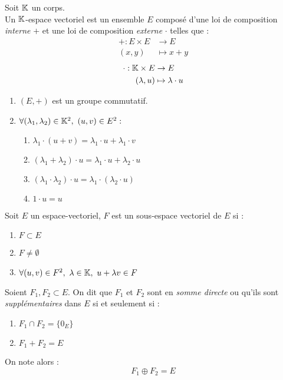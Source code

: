 \begin{definition}
	Soit $\mathbb{K}$ un corps. 
	\\
	Un $\mathbb{K}$-espace vectoriel est un ensemble $E$ composé d'une loi de composition \emph{interne} \og $+$ \fg et une loi de composition \emph{externe} \og $\cdot$ \fg telles que :
	\begin{align*}
		+ : E \times E &\to E \\
		(x, y) &\mapsto x + y
	\end{align*}
	\begin{align*}
		\cdot : \mathbb{K} \times E &\to E \\
		(\lambda, u) &\mapsto \lambda \cdot u
	\end{align*}
	\begin{enumerate}
		\item $(E, +)$ est un groupe commutatif.
		\item $\forall (\lambda_1, \lambda_2) \in \mathbb{K}^2,\ (u, v) \in E^2 :$
		\begin{multicols}{2}
            \begin{enumerate}
			\item $\lambda_1 \cdot (u + v) = \lambda_1 \cdot u + \lambda_1 \cdot v$
			\item $(\lambda_1 + \lambda_2) \cdot u = \lambda_1 \cdot u + \lambda_2 \cdot u$
			\item $(\lambda_1 \cdot \lambda_2) \cdot u = \lambda_1 \cdot (\lambda_2 \cdot u)$
			\item $1 \cdot u = u$
		\end{enumerate}
        \end{multicols}
	\end{enumerate}
\end{definition}

\begin{definition}
	Soit $E$ un espace-vectoriel, $F$ est un sous-espace vectoriel de $E$ si :
	\begin{multicols}{2}
	    \begin{enumerate}
    		\item $F \subset E$
    		\item $F \neq \emptyset$
    		\item $\forall (u, v) \in F^2,\ \lambda \in \mathbb{K},\ u + \lambda v \in F$
    	\end{enumerate}
	\end{multicols}
\end{definition}

\begin{definition}
	Soient $F_1, F_2 \subset E$. On dit que $F_1$ et $F_2$ sont en \emph{somme directe} ou qu'ils sont \emph{supplémentaires} dans $E$ si et seulement si :
	\begin{multicols}{2}
	    \begin{enumerate}
		\item $F_1 \cap F_2 = \{ 0_E \}$
		\item $F_1 + F_2 = E$
	\end{enumerate}
	\end{multicols}
	On note alors :
	\[ F_1 \oplus F_2 = E \]
\end{definition}

